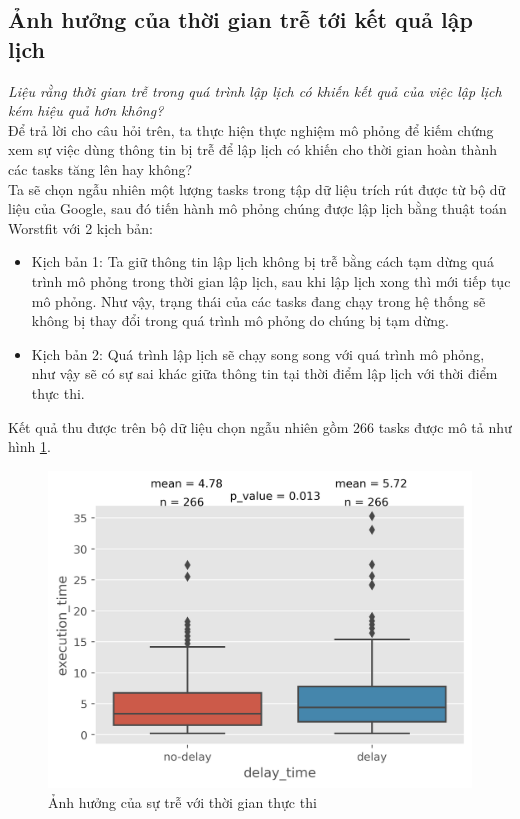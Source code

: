 \documentclass{my_style}
\begin{document}
\subsection{Ảnh hưởng của thời gian trễ tới kết quả lập lịch}
\textit{Liệu rằng thời gian trễ trong quá trình lập lịch có khiến kết quả của việc lập lịch kém hiệu quả hơn không?} \\ 
Để trả lời cho câu hỏi trên, ta thực hiện thực nghiệm mô phỏng để kiếm chứng xem sự việc dùng thông tin bị trễ để lập lịch có khiến cho thời gian hoàn thành các tasks tăng lên hay không? \\
Ta sẽ chọn ngẫu nhiên một lượng tasks trong tập dữ liệu trích rút được từ bộ dữ liệu của Google, sau đó tiến hành mô phỏng chúng được lập lịch bằng thuật toán Worstfit với 2 kịch bản: 
\begin{itemize}
	\item Kịch bản 1: Ta giữ thông tin lập lịch không bị trễ bằng cách tạm dừng quá trình mô phỏng trong thời gian lập lịch, sau khi lập lịch xong thì mới tiếp tục mô phỏng. Như vậy, trạng thái của các tasks đang chạy trong hệ thống sẽ không bị thay đổi trong quá trình mô phỏng do chúng bị tạm dừng. 
	\item Kịch bản 2: Quá trình lập lịch sẽ chạy song song với quá trình mô phỏng, như vậy sẽ có sự sai khác giữa thông tin tại thời điểm lập lịch với thời điểm thực thi. 
\end{itemize}
Kết quả thu được trên bộ dữ liệu chọn ngẫu nhiên gồm 266 tasks được mô tả như hình \ref{fig:delay_impact}. 
\begin{figure}[h!]
	\centering
	\includegraphics[scale=0.8]{images/delay_impact.png}
	\caption{Ảnh hưởng của sự trễ với thời gian thực thi}
	\label{fig:delay_impact}
\end{figure}
\end{document}
